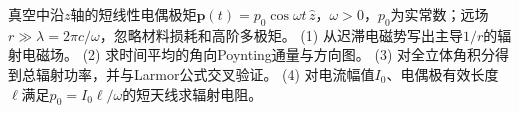 真空中沿\(z\)轴的短线性电偶极矩\(\boldsymbol p(t)=p_0\cos\omega t\,\hat z\)，\(\omega>0\)，\(p_0\)为实常数；远场\(r\gg\lambda=2\pi c/\omega\)，忽略材料损耗和高阶多极矩。
(1) 从迟滞电磁势写出主导\(1/r\)的辐射电磁场。
(2) 求时间平均的角向Poynting通量与方向图。
(3) 对全立体角积分得到总辐射功率，并与Larmor公式交叉验证。
(4) 对电流幅值\(I_0\)、电偶极有效长度\(\ell\)满足\(p_0=I_0\ell/\omega\)的短天线求辐射电阻。
